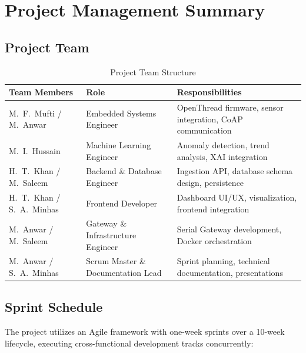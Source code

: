 \documentclass[10pt,a4paper]{article}
\begin{document}
\section{Project Management Summary}

\subsection{Project Team}

\begin{table}[htbp]
\centering
\setlength{\tabcolsep}{4pt}
\renewcommand{\arraystretch}{1.0}
\caption{Project Team Structure}
\label{tab:team}
\small
\begin{tabularx}{\textwidth}{@{} >{\raggedright\arraybackslash}p{3.5cm} >{\raggedright\arraybackslash}p{4cm} >{\raggedright\arraybackslash}X @{}}
\toprule
\textbf{Team Members} & \textbf{Role} & \textbf{Responsibilities} \\
\midrule
M.~F.~Mufti / M.~Anwar
  & Embedded Systems Engineer
  & OpenThread firmware, sensor integration, CoAP communication \\
\midrule
M.~I.~Hussain
  & Machine Learning Engineer
  & Anomaly detection, trend analysis, XAI integration \\
\midrule
H.~T.~Khan / M.~Saleem
  & Backend \& Database Engineer
  & Ingestion API, database schema design, persistence \\
\midrule
H.~T.~Khan / S.~A.~Minhas
  & Frontend Developer
  & Dashboard UI/UX, visualization, frontend integration \\
\midrule
M.~Anwar / M.~Saleem
  & Gateway \& Infrastructure Engineer
  & Serial Gateway development, Docker orchestration \\
\midrule
M.~Anwar / S.~A.~Minhas
  & Scrum Master \& Documentation Lead
  & Sprint planning, technical documentation, presentations \\
\bottomrule
\end{tabularx}
\end{table}

\newpage
\subsection{Sprint Schedule}

The project utilizes an Agile framework with one-week sprints over a 10-week lifecycle, executing cross-functional development tracks concurrently:
\end{document}
